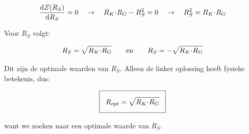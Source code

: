 \documentclass[12pt,a4paper,final,twoside,fleqn]{article}
\newcommand{\ropt}{R_{opt}}
\let\oldcdot\cdot
\renewcommand{\cdot}{\kern-.10em\oldcdot\kern-.10em}
\begin{document}
\begin{equation}
\dfrac{\text{d} Z(R_S)}{\text{d} R_S} = 0 \quad\rightarrow\quad  R_K\cdot R_G - R_S^2 = 0
\quad\rightarrow\quad R_S^2 = R_K\cdot R_G
\end{equation}

Voor $R_S$ volgt:

\begin{equation}
R_S = \sqrt{R_K\cdot R_G} \qquad\text{en}\qquad R_S = -\sqrt{R_K\cdot R_G}
\end{equation}

Dit zijn de optimale waarden van $R_S$. Alleen de linker oplossing heeft fysieke
betekenis, dus:

\begin{equation}
\setlength\fboxsep{2ex}
\boxed{\ropt = \sqrt{R_K\cdot R_G}}
\end{equation}

want we zoeken naar een optimale waarde van $R_S$.

\newpage
{}
\printbibliography{}
\end{document}
